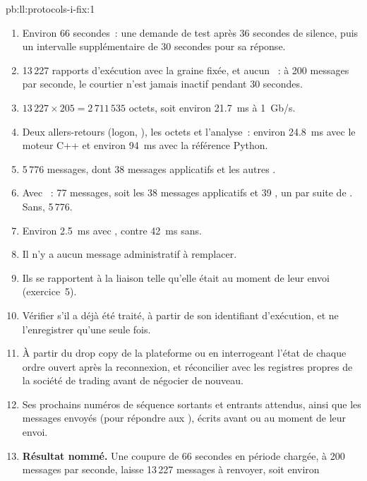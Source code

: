 \begin{solution}{pb:ll:protocols-i-fix:1}
\begin{enumerate}
\item Environ 66 secondes~: une demande de test après 36 secondes de silence, puis un intervalle supplémentaire de 30 secondes pour sa réponse.
\item 13\,227 rapports d'exécution avec la graine fixée, et aucun ~: à 200 messages par seconde, le courtier n'est jamais inactif pendant 30
secondes.
\item $13\,227 \times 205 = 2\,711\,535$ octets, soit environ \qty{21.7}{\milli\second} à 1~Gb/s.
\item Deux allers-retours (logon, ), les octets et l'analyse~: environ \qty{24.8}{\milli\second} avec le moteur C++
et environ \qty{94}{\milli\second} avec la référence Python.
\item 5\,776 messages, dont 38 messages applicatifs et les autres .
\item Avec ~: 77 messages, soit les 38 messages applicatifs et 39 , un par suite de . Sans, 5\,776.
\item Environ \qty{2.5}{\milli\second} avec , contre \qty{42}{\milli\second} sans.
\item Il n'y a aucun message administratif à remplacer.
\item Ils se rapportent à la liaison telle qu'elle était au moment de leur envoi (exercice~5).
\item Vérifier s'il a déjà été traité, à partir de son identifiant d'exécution, et ne l'enregistrer qu'une seule fois.
\item À partir du drop copy de la plateforme ou en interrogeant l'état de chaque ordre ouvert après la reconnexion, et réconcilier avec les
registres propres de la société de trading avant de négocier de nouveau.
\item Ses prochains numéros de séquence sortants et entrants attendus, ainsi que les messages envoyés (pour répondre aux ), écrits
avant ou au moment de leur envoi.
\item \textbf{Résultat nommé.} Une coupure de 66 secondes en période chargée, à 200 messages par seconde, laisse 13\,227 messages à renvoyer, soit environ

\end{enumerate}
\end{solution}
